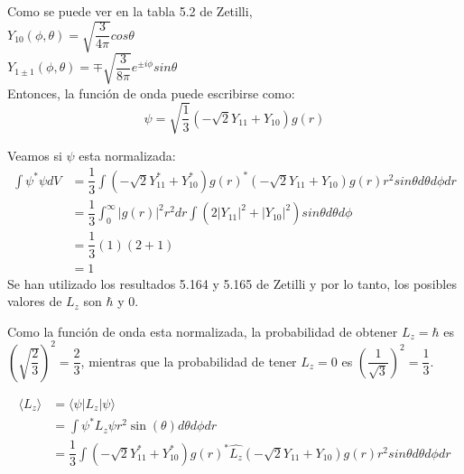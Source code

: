 \begin{solution}
  \begin{parts}
	\item Como se puede ver en la tabla 5.2 de Zetilli,\\
	
	    $Y_{10}(\phi,\theta)=\sqrt{\dfrac{3}{4 \pi}} cos \theta$\\
	    $Y_{1 \pm 1}(\phi,\theta)=\mp \sqrt{\dfrac{3}{8 \pi}}e^{\pm i \phi} sin \theta$\\
	
	Entonces, la funci\'{o}n de onda puede escribirse como:
 \begin{equation*}
     \psi=\sqrt{\dfrac{1}{3}} \left( -\sqrt{2} Y_{11} + Y_{10}\right)g(r)
 \end{equation*}

 Veamos si $\psi$ esta normalizada:
\small{
\begin{equation*}
\begin{aligned}
 \int \psi^{*} \psi dV&=\dfrac{1}{3}\int \left( -\sqrt{2}Y_{11}^{*} + Y_{10}^{*}\right)g(r)^{*} \left( -\sqrt{2} Y_{11}+Y_{10}\right)g(r) r^2 sin \theta d \theta d\phi dr \\
 &= \dfrac{1}{3}\int_0 ^{\infty} |g(r)|^2 r^2 dr \int \left( 2|Y_{11}|^2 + |Y_{10}|^2  \right)sin \theta d\theta d\phi\\
 &=\dfrac{1}{3} \left( 1\right) \left(2+1\right)\\
 &=1
 \end{aligned}\label{Norm}
\end{equation*}}
\normalsize
Se han utilizado los resultados 5.164 y 5.165 de Zetilli y por lo tanto, los posibles valores de $L_z$ son $\hbar$ y $0$.

\item Como la funci\'{o}n de onda  esta normalizada, la probabilidad de obtener $L_z=\hbar$ es $\left(\sqrt{\dfrac{2}{3}}\right)^2=\dfrac{2}{3}$, mientras que la probabilidad de tener $L_z=0$ es $\left(\dfrac{1}{\sqrt{3}}\right)^2=\dfrac{1}{3}$.

\item 
\begin{equation*}
\begin{aligned}
 \langle L_z \rangle &=\langle \psi| L_z |\psi \rangle \\
 &= \int \psi^{*} L_z \psi r^2 \sin(\theta) d \theta d\phi dr\\
 &=\dfrac{1}{3}\int \left( -\sqrt{2}Y_{11}^{*} + Y_{10}^{*}\right)g(r)^{*} \hat{L_z} \left( -\sqrt{2} Y_{11}+Y_{10}\right)g(r) r^2 sin \theta d \theta d\phi dr\\
\end{aligned}\label{Norm}
\end{equation*}


\end{parts}
\end{solution}
